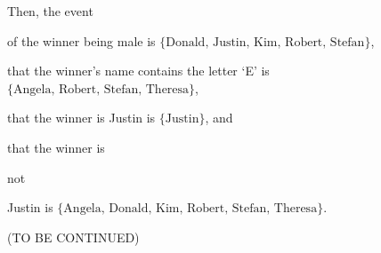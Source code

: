 \documentclass[11pt]{article}
\theoremstyle{plain}
\theoremstyle{definition}
\newenvironment{packed_enum}{
\begin{enumerate}
  \setlength{\itemsep}{1pt}
  \setlength{\parskip}{0pt}
  \setlength{\parsep}{0pt}
}{\end{enumerate}}
\begin{document}
\noindent Then, the event

\begin{packed_enum}
\item of the winner being male is $ \{ \text{Donald, Justin, Kim, Robert, Stefan} \} $, 
\item that the winner's name contains the letter `E' is $ \{ \text{Angela, Robert, Stefan, Theresa} \} $,
\item that the winner is Justin is $ \{ \text{Justin} \} $, and
\item that the winner is \begin{bf}not\end{bf} Justin is $ \{ \text{Angela, Donald, Kim, Robert, Stefan, Theresa} \} $.
\end{packed_enum} 

(TO BE CONTINUED)
\end{document}
